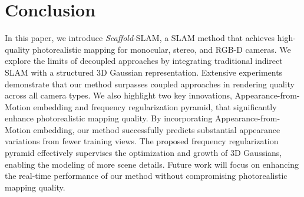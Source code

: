 \section{Conclusion}
In this paper, we introduce \emph{Scaffold}-SLAM, a SLAM method that achieves high-quality photorealistic mapping for monocular, stereo, and RGB-D cameras. We explore the limits of decoupled approaches by integrating traditional indirect SLAM with a structured 3D Gaussian representation. Extensive experiments demonstrate that our method surpasses coupled approaches in rendering quality across all camera types. We also highlight two key innovations, Appearance-from-Motion embedding and frequency regularization pyramid, that significantly enhance photorealistic mapping quality. By incorporating Appearance-from-Motion embedding, our method successfully predicts substantial appearance variations from fewer training views. The proposed frequency regularization pyramid effectively supervises the optimization and growth of 3D Gaussians, enabling the modeling of more scene details. Future work will focus on enhancing the real-time performance of our method without compromising photorealistic mapping quality.




